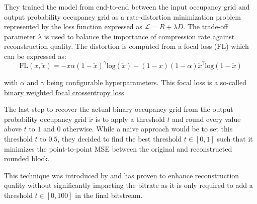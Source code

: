 They trained the model from end-to-end between the input occupancy grid and output probability occupancy grid as a rate-distortion minimization problem represented by the loss function expressed as $\mathcal{L} = R + \lambda D$. The trade-off parameter $\lambda$ is used to balance the importance of compression rate against reconstruction quality. 
The distortion is computed from a focal loss (FL) which can be expressed as: 
$$
\text{FL}(x, \tilde{x}) = -x \alpha (1-\tilde{x})^{\gamma} \text{log}(\tilde{x}) - (1-x) (1-\alpha) \tilde{x}^{\gamma} \text{log}(1-\tilde{x})
$$

\noindent with $\alpha$ and $\gamma$ being configurable hyperparameters. This focal loss is a so-called \href{https://www.tensorflow.org/api_docs/python/tf/keras/losses/BinaryFocalCrossentropy}{binary weighted focal crossentropy loss}.

The last step to recover the actual binary occupancy grid from the output probability occupancy grid $\tilde{x}$ is to apply a threshold $t$ and round every value above $t$ to $1$ and $0$ otherwise. While a naive approach would be to set this threshold $t$ to $0.5$, they decided to find the best threshold $t \in [0,1]$ such that it minimizes the point-to-point MSE \cite{bib:8296925} between the original and reconstructed rounded block.

This technique was introduced by \cite{bib:9287077} and has proven to enhance reconstruction quality without significantly impacting the bitrate as it is only required to add a threshold $t \in [0,100]$ in the final bitstream.
